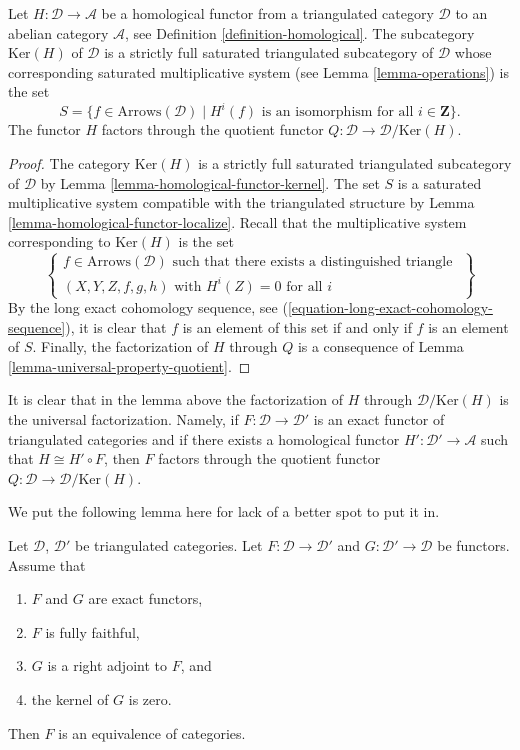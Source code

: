 \begin{lemma}
\label{lemma-acyclic-general}
Let $H : \mathcal{D} \to \mathcal{A}$ be a homological functor from a
triangulated category $\mathcal{D}$ to an abelian category $\mathcal{A}$, see
Definition \ref{definition-homological}.
The subcategory $\text{Ker}(H)$ of $\mathcal{D}$ is a strictly full
saturated triangulated subcategory of $\mathcal{D}$ whose corresponding
saturated multiplicative system (see
Lemma \ref{lemma-operations})
is the set
$$
S = \{f \in \text{Arrows}(\mathcal{D}) \mid
H^i(f)\text{ is an isomorphism for all }i \in \mathbf{Z}\}.
$$
The functor $H$ factors through the quotient functor
$Q : \mathcal{D} \to \mathcal{D}/\text{Ker}(H)$.
\end{lemma}

\begin{proof}
The category $\text{Ker}(H)$ is a strictly full saturated triangulated
subcategory of $\mathcal{D}$ by
Lemma \ref{lemma-homological-functor-kernel}.
The set $S$ is a saturated multiplicative system compatible with the
triangulated structure by
Lemma \ref{lemma-homological-functor-localize}.
Recall that the multiplicative system corresponding to
$\text{Ker}(H)$ is the set
$$
\left\{
\begin{matrix}
f \in \text{Arrows}(\mathcal{D})
\text{ such that there exists a distinguished triangle }\\
(X, Y, Z, f, g, h)\text{ with } H^i(Z) = 0 \text{ for all }i
\end{matrix}
\right\}
$$
By the long exact cohomology sequence, see
(\ref{equation-long-exact-cohomology-sequence}),
it is clear that $f$ is an element of this set if and only if $f$ is
an element of $S$. Finally, the factorization of $H$ through $Q$ is a
consequence of
Lemma \ref{lemma-universal-property-quotient}.
\end{proof}

\noindent
It is clear that in the lemma above the factorization of $H$ through
$\mathcal{D}/\text{Ker}(H)$ is the universal factorization. Namely, if
$F : \mathcal{D} \to \mathcal{D}'$ is an exact functor of triangulated
categories and if there exists a homological functor
$H' : \mathcal{D}' \to \mathcal{A}$ such that $H \cong H' \circ F$, then
$F$ factors through the quotient functor
$Q : \mathcal{D} \to \mathcal{D}/\text{Ker}(H)$.

\medskip\noindent
We put the following lemma here for lack of a better spot to put it in.

\begin{lemma}
\label{lemma-fully-faithful-adjoint-kernel-zero}
Let $\mathcal{D}$, $\mathcal{D}'$ be triangulated categories.
Let $F : \mathcal{D} \to \mathcal{D}'$ and
$G : \mathcal{D}' \to \mathcal{D}$ be functors. Assume that
\begin{enumerate}
\item $F$ and $G$ are exact functors,
\item $F$ is fully faithful,
\item $G$ is a right adjoint to $F$, and
\item the kernel of $G$ is zero.
\end{enumerate}
Then $F$ is an equivalence of categories.
\end{lemma}

